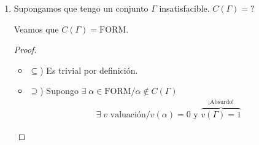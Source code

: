 \begin{enumerate}
\begin{enumerate}
\begin{proof}
\begin{itemize}
                    \medskip

                    Supongo que no 
                    $\implies \exists \; v \text{ valuación}/v(\alpha)=0$

                    Pero $v(\varnothing)=1 \implies \alpha \notin
                    C(\varnothing)$

                    ¡Absurdo!
                    Vino de suponer que $\alpha$ no era una tautología.

                \item[$\supseteq$)] Sea $\alpha$ tautología.
                    Quiero ver que $\alpha \in C(\varnothing)$

                    \medskip

                    Sea $v \text{ valuación} / v(\varnothing)=1$
                    $\implies \underbrace{v(\alpha)=1}_{\alpha \text{ taut.}}$
            \end{itemize}
        \end{proof}

        \bigskip

        Otra forma:

        \begin{proof} \phantom{.}
        
            Como toda valuación satisface el $\varnothing$, si 
            \begin{gather*}
                \alpha \in C(\varnothing) \implies v(\alpha) = 1
                \notamath{$\forall v$ valuación} \\
            \end{gather*}
            \begin{gather*}
                \therefore ~ \alpha \in C(\varnothing) \iff \alpha 
                \text{ es tautología}
            \end{gather*}
        \end{proof}

    \item Supongamos que tengo un conjunto $\Gamma$ insatisfacible.
        $C(\Gamma) = ?$

        Veamos que $C(\Gamma) = \mathrm{FORM}$.

        \begin{proof} \phantom{.}
        
        \begin{itemize}
            \item $\subseteq$) Es trivial por definición.
            \item $\supseteq$) Supongo
                $\exists \; \alpha \in \mathrm{FORM} / \alpha \notin C(\Gamma)$
                \begin{gather*}
                    \exists \; v \text{ valuación}/v(\alpha)=0 
                    \text{ y } \overbrace{v(\Gamma) = 1}^{\text{¡Absurdo!}}
                \end{gather*}


\end{itemize}
\end{proof}
\end{enumerate}
\end{enumerate}
